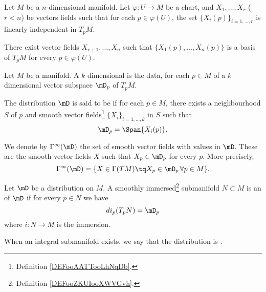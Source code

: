 \begin{lemma}       \label{LEMooGHQZooMIWAfn}
	Let \( M\) be a \( n\)-dimensional manifold. Let \( \varphi\colon U\to M\) be a chart, and \( X_1,\ldots, X_r\) (\( r<n\)) be vectors fields such that for each \( p\in \varphi(U)\), the set \( \{ X_i(p) \}_{i=1,\ldots, r}\) is linearly independent in \( T_pM\).

	There exist vector fields \( X_{r+1},\ldots,  X_n\) such that \( \{  X_1(p),\ldots, X_n(p) \}\) is a basis of \( T_pM\) for every \( p\in \varphi(U)\).
\end{lemma}

\begin{definition}      \label{DEFooYOMHooZJvsSt}
	Let \( M\) be a manifold. A \( k\) dimensional  is the data, for each \( p\in M\) of a \( k\) dimensional vector subspace \( \mD_p\) of \( T_pM\).

	The distribution \( \mD\) is said to be  if for each \( p\in M\), there exists a neighbourhood \( S\) of \( p\) and smooth vector fields\footnote{Definition \ref{DEFooAATTooLhNqDb}.} \( \{ X_i \}_{i=1,\ldots, k}\) in \( S\) such that
	\begin{equation}
		\mD_p=\Span\{ X_i(p) \}.
	\end{equation}

	We denote by \( \Gamma^{\infty}(\mD) \) the set of smooth vector fields with values in \( \mD\). These are the smooth vector fields \( X\) such that \( X_p\in \mD_p\) for every \( p\). More precisely,
	\begin{equation}
		\Gamma^{\infty}(\mD)=\{ X\in \Gamma(TM)\tq X_p\in\mD_p\,\forall p\in M \}.
	\end{equation}
\end{definition}

\begin{definition}
	Let \( \mD\) be a distribution on \( M\). A smoothly immersed\footnote{Definition \ref{DEFooZKUIooXWVGvh}.} submanifold \( N\subset M\) is an  of \( \mD\) if for every \( p\in N\) we have
	\begin{equation}
		di_p(T_pN)=\mD_p
	\end{equation}
	where \( i\colon N\to M\) is the immersion.

	When an integral submanifold exists, we say that the distribution is .
\end{definition}

